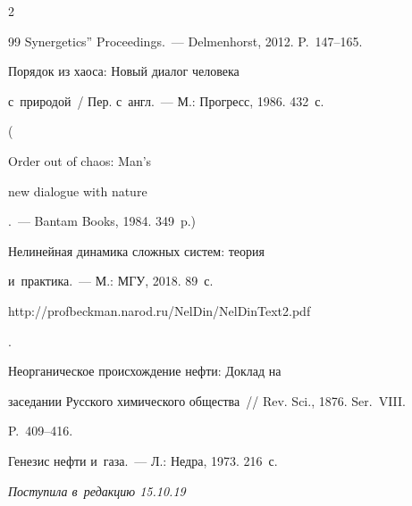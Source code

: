\begin{multicols}{2}
{{\begin{thebibliography}{99}
Synergetics'' Proceedings.~--- Delmenhorst, 2012. P.~147--165.


     Порядок из хаоса: Новый диалог человека 

с~природой~/ Пер. с~англ.~--- М.: Прогресс, 1986. 432~с.

( {Order out of chaos: Man's

new dialogue with nature}.~--- Bantam Books, 1984. 349~p.)


     Нелинейная динамика сложных систем: теория 

и~практика.~--- М.: МГУ, 2018. 89~с.

{\sf 

http://\linebreak profbeckman.narod.ru/NelDin/NelDinText2.pdf}.


     Неорганическое происхождение нефти: Доклад на 

заседании Русского химического общества~// Rev. Sci., 1876. Ser.~VIII. 

P.~409--416.


     Генезис нефти и~газа.~--- Л.: Недра, 1973. 216~с.

     \end{thebibliography}



 }

 }



\end{multicols}



\vspace*{-6pt}



\hfill{\small\textit{Поступила в~редакцию 15.10.19}}



\vspace*{8pt}













